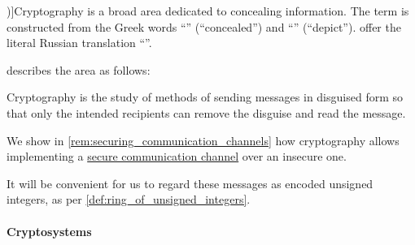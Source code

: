 \begin{concept}\label{con:cryptography}
  \term[ru=криптография (\cite[52]{АлферовИПр2002ОсновыКриптографии})]{Cryptography} is a broad area dedicated to concealing information. The term is constructed from the Greek words \enquote{} (\enquote{concealed}) and \enquote{} (\enquote{depict}). \Textcite[52]{АлферовИПр2002ОсновыКриптографии} offer the literal Russian translation \enquote{}.

  \Textcite[54]{Koblitz1994NumberTheoryAndCryptography} describes the area as follows:
  \begin{displayquote}
    Cryptography is the study of methods of sending messages in disguised form so that only the intended recipients can remove the disguise and read the message.
  \end{displayquote}

  We show in \cref{rem:securing_communication_channels} how cryptography allows implementing a \hyperref[con:privacy]{secure communication channel} over an insecure one.
\end{concept}
\begin{comments}
  \item It will be convenient for us to regard these messages as encoded unsigned integers, as per \cref{def:ring_of_unsigned_integers}.
\end{comments}

\paragraph{Cryptosystems}

